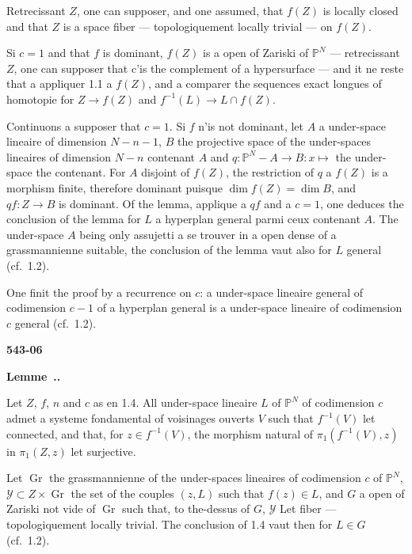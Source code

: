 \documentclass[12pt,a4paper]{article}
\newcounter{secitem}
\renewcommand{\thesecitem}{\thesection.\arabic{secitem}}
\newenvironment{seclemma}{%
  \refstepcounter{secitem}%
  \par\medskip\noindent\textbf{Lemme~\thesecitem.}~\ignorespaces
}{\par\medskip}
\DeclareMathOperator{\Gr}{Gr}
\begin{document}
Retrecissant $Z$, one can supposer, and one assumed, that $f(Z)$ is locally closed and that $Z$ is a space fiber --- topologiquement locally trivial --- on $f(Z)$.

Si $c = 1$ and that $f$ is dominant, $f(Z)$ is a open of Zariski of $\mathbb{P}^N$ --- retrecissant $Z$, one can supposer that c'is the complement of a hypersurface --- and it ne reste that a appliquer 1.1 a $f(Z)$, and a comparer the sequences exact longues of homotopie for $Z \to f(Z)$ and $f^{-1}(L) \to L \cap f(Z)$.

Continuons a supposer that $c = 1$. Si $f$ n'is not dominant, let $A$ a under-space lineaire of dimension $N - n - 1$, $B$ the projective space of the under-spaces lineaires of dimension $N - n$ contenant $A$ and $q : \mathbb{P}^N - A \to B : x \mapsto$ the under-space the contenant. For $A$ disjoint of $f(Z)$, the restriction of $q$ a $f(Z)$ is a morphism finite, therefore dominant puisque $\dim f(Z) = \dim B$, and $qf : Z \to B$ is dominant. Of the lemma, applique a $qf$ and a $c = 1$, one deduces the conclusion of the lemma for $L$ a hyperplan general parmi ceux contenant $A$. The under-space $A$ being only assujetti a se trouver in a open dense of a grassmannienne suitable, the conclusion of the lemma vaut also for $L$ general (cf.\ 1.2).

One finit the proof by a recurrence on $c$: a under-space lineaire general of codimension $c - 1$ of a hyperplan general is a under-space lineaire of codimension $c$ general (cf.\ 1.2).

\newpage
\begin{flushright}
\textbf{543-06}
\end{flushright}

\begin{seclemma}
Let $Z$, $f$, $n$ and $c$ as en 1.4. All under-space lineaire $L$ of $\mathbb{P}^N$ of codimension $c$ admet a systeme fondamental of voisinages ouverts $V$ such that $f^{-1}(V)$ let connected, and that, for $z \in f^{-1}(V)$, the morphism natural of $\pi_1(f^{-1}(V), z)$ in $\pi_1(Z, z)$ let surjective.
\end{seclemma}

Let $\Gr$ the grassmannienne of the under-spaces lineaires of codimension $c$ of $\mathbb{P}^N$, $\mathcal{Y} \subset Z \times \Gr$ the set of the couples $(z, L)$ such that $f(z) \in L$, and $G$ a open of Zariski not vide of $\Gr$ such that, to the-dessus of $G$, $\mathcal{Y}$ Let fiber --- topologiquement locally trivial. The conclusion of 1.4 vaut then for $L \in G$ (cf.\ 1.2).
\end{document}
